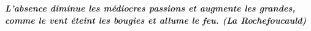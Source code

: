 \documentclass[12pt,a4paper]{article}
\newcommand{\R}{\mathbb{R}}
\theoremstyle{break}
\begin{document}
\vspace*{3mm}
\textbf{}
\emph{\textbf{
	L'absence diminue les médiocres passions et augmente les grandes, comme le vent éteint les bougies et allume le feu. (La Rochefoucauld)
}}
\vspace*{2mm}

%
%
%
%
%
%
\end{document}
